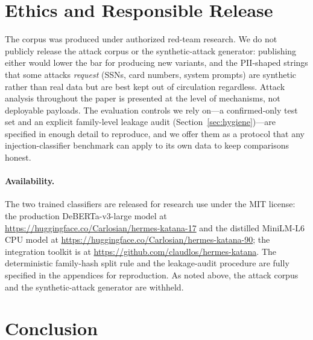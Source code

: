 \documentclass{article}
\begin{document}
\section{Ethics and Responsible Release}

The corpus was produced under authorized red-team research. We do not publicly release the attack corpus or the synthetic-attack generator: publishing either would lower the bar for producing new variants, and the PII-shaped strings that some attacks \emph{request} (SSNs, card numbers, system prompts) are synthetic rather than real data but are best kept out of circulation regardless. Attack analysis throughout the paper is presented at the level of mechanisms, not deployable payloads. The evaluation controls we rely on---a confirmed-only test set and an explicit family-level leakage audit (Section~\ref{sec:hygiene})---are specified in enough detail to reproduce, and we offer them as a protocol that any injection-classifier benchmark can apply to its own data to keep comparisons honest.

\paragraph{Availability.} The two trained classifiers are released for research use under the MIT license: the production DeBERTa-v3-large model at \url{https://huggingface.co/Carlosian/hermes-katana-17} and the distilled MiniLM-L6 CPU model at \url{https://huggingface.co/Carlosian/hermes-katana-90}; the integration toolkit is at \url{https://github.com/claudlos/hermes-katana}. The deterministic family-hash split rule and the leakage-audit procedure are fully specified in the appendices for reproduction. As noted above, the attack corpus and the synthetic-attack generator are withheld.

\section{Conclusion}
\end{document}
